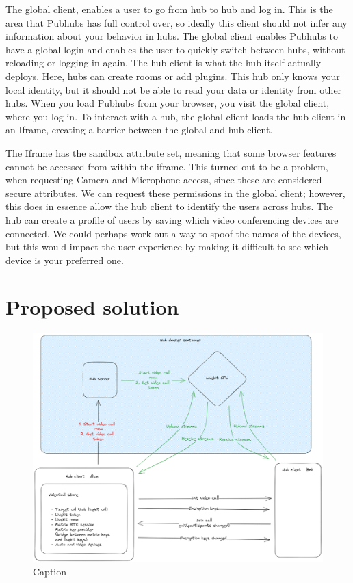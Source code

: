 \documentclass{report}
\begin{document}
    The global client, enables a user to go from hub to hub and log in. This is the area that Pubhubs has full control
    over, so ideally this client should not infer any information about your behavior in hubs. The global client enables
    Pubhubs to have a global login and enables the user to quickly switch between hubs, without reloading or logging in
    again. The hub client is what the hub itself actually deploys. Here, hubs can create rooms or add plugins. This hub
    only knows your local identity, but it should not be able to read your data or identity from other hubs. When you
    load Pubhubs from your browser, you visit the global client, where you log in. To interact with a hub, the global
    client loads the hub client in an Iframe, creating a barrier between the global and hub client.

    The Iframe has the sandbox attribute set, meaning that some browser features cannot be accessed from within the
    iframe. This turned out to be a problem, when requesting Camera and Microphone access, since these are considered
    secure attributes. We can request these permissions in the global client; however, this does in essence allow the
    hub client to identify the users across hubs. The hub can create a profile of users by saving which video
    conferencing devices are connected. We could perhaps work out a way to spoof the names of the devices, but this
    would impact the user experience by making it difficult to see which device is your preferred one.



    \chapter{Proposed solution}

    \begin{figure}
        \centering
        \includegraphics[width=\textwidth]{Master thesis/img/PH_videocall.excalidraw.png}
        \caption{Caption}
        \label{fig:enter-label}
    \end{figure}
\end{document}
